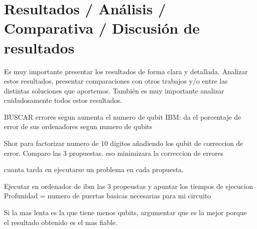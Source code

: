 \chapter{Resultados / Análisis / Comparativa / Discusión de resultados}
Es muy importante presentar los resultados de forma clara y detallada. Analizar estos resultados, presentar comparaciones con otros trabajos y/o entre las distintas soluciones que aportemos. También es muy importante analizar cuidadosamente todos estos resultados.




BUSCAR errores segun aumenta el numero de qubit
IBM: da el porcentaje de error de sus ordenadores segun numero de qubits


Shor para factorizar numero de 10 digitos añadiendo los qubit de correccion de error.
Comparo las 3 propuestas.
eso minimizara la correccion de errores

cuanta tarda en ejecutarse un problema en cada propuesta.



Ejecutar en ordenador de ibm las 3 propeustas y apuntar los tiempos de ejecucion
Profunidad = numero de puertas basicas necesarias para mi circuito

Si la mas lenta es la que tiene menos qubits, argumentar que es la mejor porque el resultado obtenido es el mas fiable.

